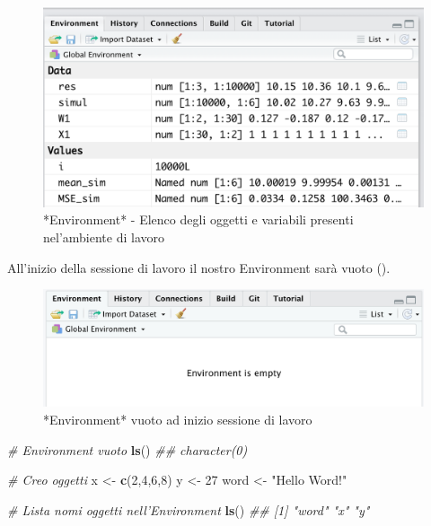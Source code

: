 \documentclass[
]{book}
\newenvironment{Shaded}{\begin{snugshade}}{\end{snugshade}}
\newcommand{\CommentTok}[1]{\textcolor[rgb]{0.56,0.35,0.01}{\textit{#1}}}
\newcommand{\DecValTok}[1]{\textcolor[rgb]{0.00,0.00,0.81}{#1}}
\newcommand{\KeywordTok}[1]{\textcolor[rgb]{0.13,0.29,0.53}{\textbf{#1}}}
\newcommand{\NormalTok}[1]{#1}
\newcommand{\StringTok}[1]{\textcolor[rgb]{0.31,0.60,0.02}{#1}}
\begin{document}
\begin{figure}

{\centering \includegraphics[width=0.6\linewidth]{images/environment} 

}

\caption{*Environment* - Elenco degli oggetti e variabili presenti nel'ambiente di lavoro}\label{fig:environment2}
\end{figure}

All'inizio della sessione di lavoro il nostro Environment sarà vuoto ().

\begin{figure}

{\centering \includegraphics[width=0.6\linewidth]{images/environment-empty} 

}

\caption{*Environment* vuoto ad inizio sessione di lavoro}\label{fig:environment-empty}
\end{figure}

\begin{Shaded}
\begin{Highlighting}[]
\CommentTok{# Environment vuoto}
\KeywordTok{ls}\NormalTok{()}
\CommentTok{## character(0)}
\end{Highlighting}
\end{Shaded}

\begin{Shaded}
\begin{Highlighting}[]
\CommentTok{# Creo oggetti}
\NormalTok{x <-}\StringTok{  }\KeywordTok{c}\NormalTok{(}\DecValTok{2}\NormalTok{,}\DecValTok{4}\NormalTok{,}\DecValTok{6}\NormalTok{,}\DecValTok{8}\NormalTok{)}
\NormalTok{y <-}\StringTok{  }\DecValTok{27}
\NormalTok{word <-}\StringTok{ "Hello Word!"}

\CommentTok{# Lista nomi oggetti nell'Environment}
\KeywordTok{ls}\NormalTok{()}
\CommentTok{## [1] "word" "x"    "y"}
\end{Highlighting}
\end{Shaded}
\end{document}
